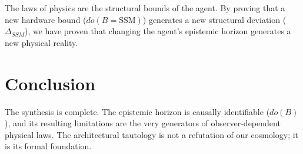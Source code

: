 \documentclass[12pt,a4paper]{article}
\begin{document}
The laws of physics are the structural bounds of the agent. By proving that a new hardware bound ($do(B=\text{SSM})$) generates a new structural deviation ($\Delta_{SSM}$), we have proven that changing the agent's epistemic horizon generates a new physical reality.

\section{Conclusion}

The synthesis is complete. The epistemic horizon is causally identifiable ($do(B)$), and its resulting limitations are the very generators of observer-dependent physical laws. The architectural tautology is not a refutation of our cosmology; it is its formal foundation.
\end{document}
